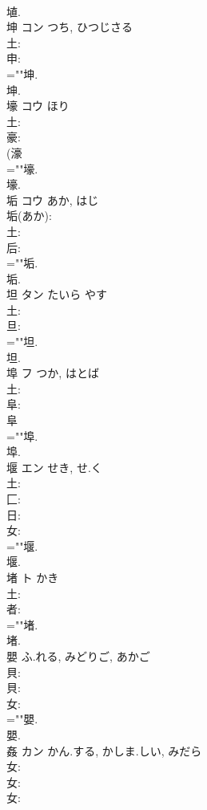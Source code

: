 \documentclass[8pt]{extreport}
\begin{document}
\begin{CJK}{UTF8}{min}
\\	埴.
\\	坤	コン	つち, ひつじさる		
\\	土: 
\\	申: 
\\	=""坤.
\\	坤.
\\	壕	コウ	ほり		
\\	土: 
\\	豪: 
\\	(濠 
\\	=""壕.
\\	壕.
\\	垢	コウ	あか, はじ		
\\	垢(あか): 
\\	土: 
\\	后: 
\\	=""垢.
\\	垢.
\\	坦	タン	たいら	やす	
\\	土: 
\\	旦: 
\\	=""坦.
\\	坦.
\\	埠	フ	つか, はとば		
\\	土: 
\\	阜: 
\\	阜 
\\	=""埠.
\\	埠.
\\	堰	エン	せき, せ.く		
\\	土: 
\\	匚: 
\\	日: 
\\	女: 
\\	=""堰.
\\	堰.
\\	堵	ト	かき		
\\	土: 
\\	者: 
\\	=""堵.
\\	堵.
\\	嬰		ふ.れる, みどりご, あかご				
\\	貝: 
\\	貝: 
\\	女: 
\\	=""嬰.
\\	嬰.
\\	姦	カン	かん.する, かしま.しい, みだら		
\\	女: 
\\	女: 
\\	女: 

\end{CJK}
\end{document}
